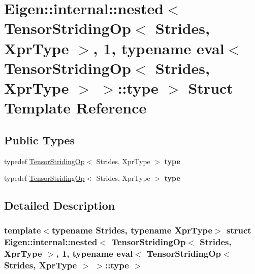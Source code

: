 \hypertarget{struct_eigen_1_1internal_1_1nested_3_01_tensor_striding_op_3_01_strides_00_01_xpr_type_01_4_00_02d594d957e3c480f253fbd76dacb178f}{}\section{Eigen\+:\+:internal\+:\+:nested$<$ Tensor\+Striding\+Op$<$ Strides, Xpr\+Type $>$, 1, typename eval$<$ Tensor\+Striding\+Op$<$ Strides, Xpr\+Type $>$ $>$\+:\+:type $>$ Struct Template Reference}
\label{struct_eigen_1_1internal_1_1nested_3_01_tensor_striding_op_3_01_strides_00_01_xpr_type_01_4_00_02d594d957e3c480f253fbd76dacb178f}
\subsection*{Public Types}
\begin{DoxyCompactItemize}
\item 
\mbox{\label{struct_eigen_1_1internal_1_1nested_3_01_tensor_striding_op_3_01_strides_00_01_xpr_type_01_4_00_02d594d957e3c480f253fbd76dacb178f_ac2d0d1bab126fcffde44f160ef6582a9}} 
typedef \hyperlink{class_eigen_1_1_tensor_striding_op}{Tensor\+Striding\+Op}$<$ Strides, Xpr\+Type $>$ {\bfseries type}
\item 
\mbox{\label{struct_eigen_1_1internal_1_1nested_3_01_tensor_striding_op_3_01_strides_00_01_xpr_type_01_4_00_02d594d957e3c480f253fbd76dacb178f_ac2d0d1bab126fcffde44f160ef6582a9}} 
typedef \hyperlink{class_eigen_1_1_tensor_striding_op}{Tensor\+Striding\+Op}$<$ Strides, Xpr\+Type $>$ {\bfseries type}
\end{DoxyCompactItemize}


\subsection{Detailed Description}
\subsubsection*{template$<$typename Strides, typename Xpr\+Type$>$\newline
struct Eigen\+::internal\+::nested$<$ Tensor\+Striding\+Op$<$ Strides, Xpr\+Type $>$, 1, typename eval$<$ Tensor\+Striding\+Op$<$ Strides, Xpr\+Type $>$ $>$\+::type $>$}



